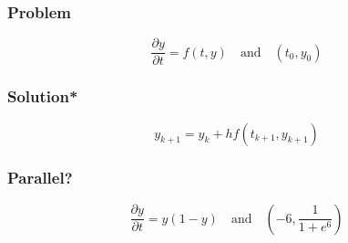 \begin{frame}
\frametitle{Problem}
\begin{equation*}
\frac{\partial y}{\partial t} = f(t,y) \quad \textrm{and} \quad (t_0, y_0)
\end{equation*}
\end{frame}

\begin{frame}
\frametitle{Solution*}
\begin{equation*}
y_{k+1} = y_k + hf\left(t_{k+1}, y_{k+1}\right)
\end{equation*}
\end{frame}

\begin{frame}
\frametitle{Parallel?}
\begin{center}
\scalebox{0.5}{}
\end{center}
\begin{equation*}
\frac{\partial y}{\partial t} = y (1-y) \quad \textrm{and} \quad \left(-6, \frac{1}{1+e^6}\right)
\end{equation*}
\end{frame}

\begin{frame}
\begin{center}
\scalebox{0.65}{}
\end{center}
\end{frame}

\begin{frame}
\begin{center}
\scalebox{0.65}{}
\end{center}
\end{frame}


